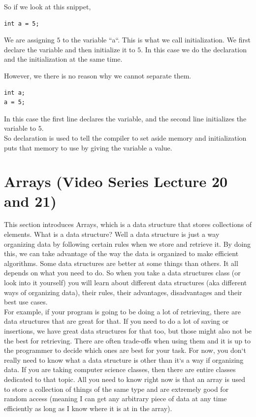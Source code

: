 \documentclass[11]{article}
\begin{document}
So if we look at this snippet, 

\begin{lstlisting}
int a = 5;
\end{lstlisting}

We  are assigning $5$ to the variable ``a``. This is what we call initialization. We first declare the variable and then initialize it to $5$. In this case we do the declaration and the initialization at the same time. 

However, we there is no reason why we cannot separate them.
\begin{lstlisting}
int a;
a = 5;
\end{lstlisting}

In this case the first line declares the variable, and the second line initializes the variable to $5$.\\

So declaration is used to tell the compiler to set aside memory and initialization puts that memory to use by giving the variable a value.

\section{Arrays (Video Series Lecture 20 and 21)}
This section introduces Arrays, which is a data structure that stores collections of elements. What is a data structure? Well a data structure is just a way organizing data by following certain rules when we store and retrieve it. By doing this, we can take advantage of the way the data is organized to make efficient algorithms. Some data structures are better at some things than others. It all depends on what you need to do. So when you take a data structures class (or look into it yourself) you will learn about different data structures (aka different ways of organizing data), their rules, their advantages, disadvantages and their best use cases.\\

For example, if your program is going to be doing a lot of retrieving, there are data structures that are great for that. If you need to do a lot of saving or insertions, we have great data structures for that too, but those might also not be the best for retrieving. There are often trade-offs when using them and it is up to the programmer to decide which ones are best for your task. For now, you don`t really need to know what a data structure is other than it`s a way if organizing data. If you are taking computer science classes, then there are entire classes dedicated to that topic. All you need to know right now is that an array is used to store a collection of things of the same type and are extremely good for random access (meaning I can get any arbitrary piece of data at any time efficiently as long as I know where it is at in the array).
\end{document}

